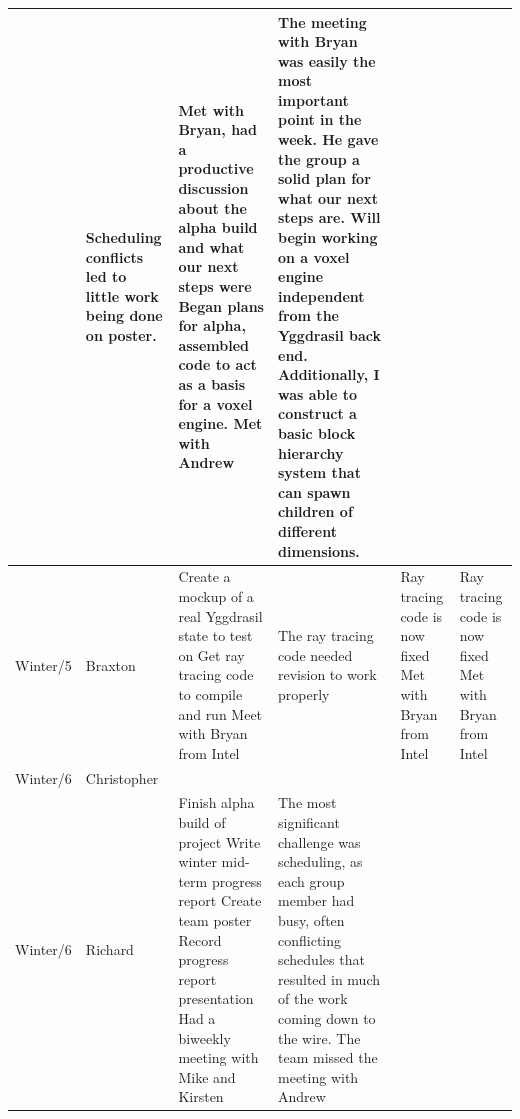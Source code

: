\documentclass[onecolumn, draftclsnofoot,10pt, compsoc]{IEEEtran}
\begin{document}
\begin{tiny}
\begin{longtable}{ | p{} | p{} | p{} | p{} | p{} | p{} | }
&
Scheduling conflicts led to little work being done on poster. 
&
Met with Bryan, had a productive discussion about the alpha build and what our next steps were \newline
Began plans for alpha, assembled code to act as a basis for a voxel engine. \newline
Met with Andrew

&
The meeting with Bryan was easily the most important point in the week. He gave the group a solid plan for what our next steps are. Will begin working on a voxel engine independent from the Yggdrasil back end. Additionally, I was able to construct a basic block hierarchy system that can spawn children of different dimensions. 
\\ \hline
Winter/5 & Braxton & 

Create a mockup of a real Yggdrasil state to test on \newline
Get ray tracing code to compile and run \newline
Meet with Bryan from Intel 

&

The ray tracing code needed revision to work properly 

&

Ray tracing code is now fixed \newline
Met with Bryan from Intel 

&

Ray tracing code is now fixed \newline
Met with Bryan from Intel 

\\ \hline
Winter/6 & Christopher & 

&

&

&

\\ \hline
Winter/6 & Richard & 
Finish alpha build of project \newline
Write winter mid-term progress report \newline
Create team poster \newline
Record progress report presentation \newline
Had a biweekly meeting with Mike and Kirsten 

&
The most significant challenge was scheduling, as each group member had busy, often conflicting schedules that resulted in much of the work coming down to the wire. \newline
The team missed the meeting with Andrew 


\end{longtable}
\end{tiny}
\end{document}
